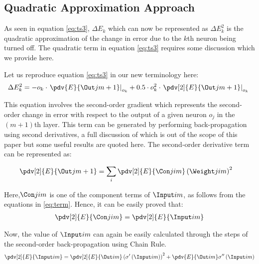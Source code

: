 \subsection{Quadratic Approximation Approach}

As seen in equation \ref{eq:ts3}, $\Delta E_k$ which can now be represented as $\Delta E_{k}^2$ is the quadratic approximation of the change in error due to the $k$th neuron being turned off. The quadratic term in equation \ref{eq:ts3} requires some discussion which we provide here.

Let us reproduce equation \ref{eq:ts3} in our new terminology here: 
\begin{align}
\Delta E_{k}^2 = - o_k\cdot \left.\pdv{E}{{\Out j {m+1}}}\right|_{o_k} + 0.5\cdot o_k^2\cdot \left.\pdv[2]{E}{{\Out j {m+1}}}\right|_{o_k}\
\end{align}

This equation involves the second-order gradient which represents the second-order change in error with respect to the output of a given neuron $o_j$ in the $(m+1)$th layer. This term can be generated by performing back-propagation using second derivatives, a full discussion of which is out of the scope of this paper but some useful results are quoted here. The second-order derivative term can be represented as:

\begin{align}
\pdv[2]{E}{{\Out j {m+1}}} &= \sum_i
\pdv[2]{E}{{\Con j i m}} \left({\Weight j i m}\right)^2
\end{align} 

Here,$\Con j i m$ is one of the component terms of $\Input i m$, as follows from the equations in \ref{eq:term}. Hence, it can be easily proved that:
\begin{align}
\pdv[2]{E}{{\Con j i m}} = \pdv[2]{E}{{\Input i m}}
\end{align}

Now, the value of $\Input i m$ can again be easily calculated through the steps of the second-order back-propagation using Chain Rule. 
\begin{align}
\pdv[2]{E}{{\Input i m}}=\pdv[2]{E}{{\Out i m}} \left(\sigma^{\prime}\left({\Input i m}\right)\right)^2
+
\pdv{E}{{\Out i m}}\sigma^{\prime\prime}\left(\Input i m\right)
\end{align}
